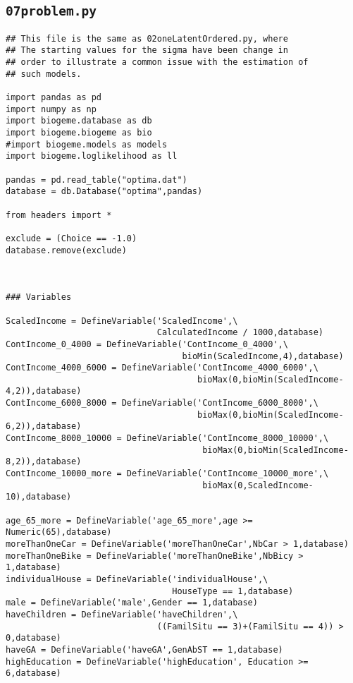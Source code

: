 \documentclass[12pt,a4paper]{article}
\begin{document}
\subsection{\lstinline$07problem.py$}
\label{sec:07problem}

\begin{lstlisting}[style=numbers]
## This file is the same as 02oneLatentOrdered.py, where
## The starting values for the sigma have been change in
## order to illustrate a common issue with the estimation of
## such models.

import pandas as pd
import numpy as np
import biogeme.database as db
import biogeme.biogeme as bio
#import biogeme.models as models
import biogeme.loglikelihood as ll

pandas = pd.read_table("optima.dat")
database = db.Database("optima",pandas)

from headers import *

exclude = (Choice == -1.0)
database.remove(exclude)



### Variables

ScaledIncome = DefineVariable('ScaledIncome',\
                              CalculatedIncome / 1000,database)
ContIncome_0_4000 = DefineVariable('ContIncome_0_4000',\
                                   bioMin(ScaledIncome,4),database)
ContIncome_4000_6000 = DefineVariable('ContIncome_4000_6000',\
                                      bioMax(0,bioMin(ScaledIncome-4,2)),database)
ContIncome_6000_8000 = DefineVariable('ContIncome_6000_8000',\
                                      bioMax(0,bioMin(ScaledIncome-6,2)),database)
ContIncome_8000_10000 = DefineVariable('ContIncome_8000_10000',\
                                       bioMax(0,bioMin(ScaledIncome-8,2)),database)
ContIncome_10000_more = DefineVariable('ContIncome_10000_more',\
                                       bioMax(0,ScaledIncome-10),database)

age_65_more = DefineVariable('age_65_more',age >= Numeric(65),database)
moreThanOneCar = DefineVariable('moreThanOneCar',NbCar > 1,database)
moreThanOneBike = DefineVariable('moreThanOneBike',NbBicy > 1,database)
individualHouse = DefineVariable('individualHouse',\
                                 HouseType == 1,database)
male = DefineVariable('male',Gender == 1,database)
haveChildren = DefineVariable('haveChildren',\
                              ((FamilSitu == 3)+(FamilSitu == 4)) > 0,database)
haveGA = DefineVariable('haveGA',GenAbST == 1,database)
highEducation = DefineVariable('highEducation', Education >= 6,database)


\end{lstlisting}
\end{document}

